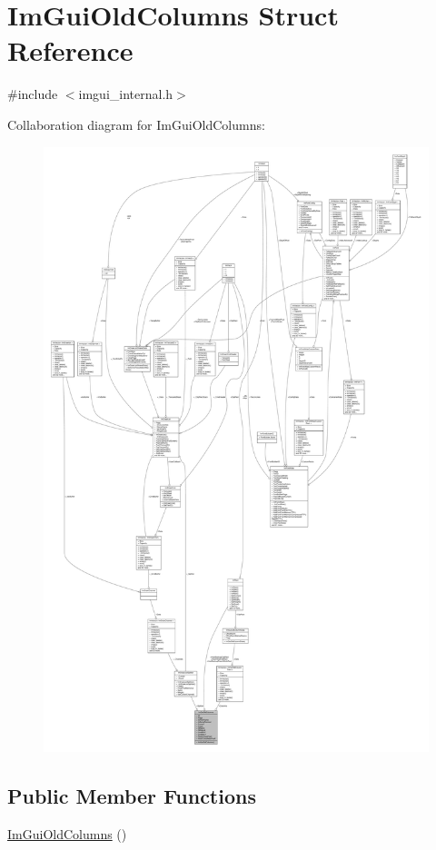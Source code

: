 \hypertarget{structImGuiOldColumns}{}\section{Im\+Gui\+Old\+Columns Struct Reference}
\label{structImGuiOldColumns}


{\ttfamily \#include $<$imgui\+\_\+internal.\+h$>$}



Collaboration diagram for Im\+Gui\+Old\+Columns\+:
\nopagebreak
\begin{figure}[H]
\begin{center}
\leavevmode
\includegraphics[width=350pt]{structImGuiOldColumns__coll__graph}
\end{center}
\end{figure}
\subsection*{Public Member Functions}
\begin{DoxyCompactItemize}
\item 
\hyperlink{structImGuiOldColumns_ab8cae447d704e5d9ca332af63301fbf9}{Im\+Gui\+Old\+Columns} ()
\end{DoxyCompactItemize}
